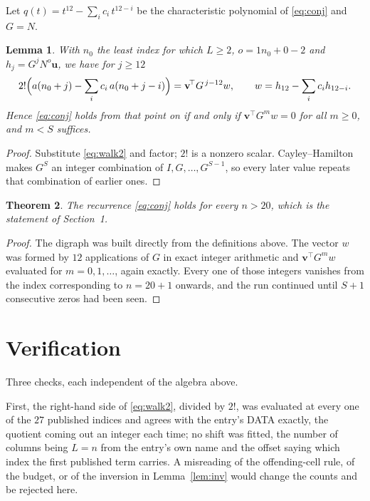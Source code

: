 \documentclass[11pt,a4paper]{article}
\theoremstyle{plain}
\newtheorem{theorem}{Theorem}
\newtheorem{lemma}[theorem]{Lemma}
\theoremstyle{definition}
\begin{document}
Let $q(t)=t^{12}-\sum_i c_i\,t^{12-i}$ be the characteristic polynomial of
\eqref{eq:conj} and $G=N$.

\begin{lemma}\label{lem:crit}
With $n_0$ the least index for which $L\ge2$, $o=1n_0+0-2$ and
$h_j=G^{j}N^{o}\mathbf{u}$, we have for $j\ge12$
\[
2!\Bigl(a(n_0+j)-\sum_i c_i\,a(n_0+j-i)\Bigr)=\mathbf{v}^{\!\top}G^{\,j-12}w,
\qquad w=h_{12}-\sum_i c_i h_{12-i} .
\]
Hence \eqref{eq:conj} holds from that point on if and only if
$\mathbf{v}^{\!\top}G^{m}w=0$ for all $m\ge0$, and $m<S$ suffices.
\end{lemma}

\begin{proof}
Substitute \eqref{eq:walk2} and factor; $2!$ is a nonzero scalar. Cayley--Hamilton
makes $G^{S}$ an integer combination of $I,G,\dots,G^{S-1}$, so every later value repeats
that combination of earlier ones.
\end{proof}

\begin{theorem}
The recurrence \eqref{eq:conj} holds for every $n>20$, which is the statement of
Section~1.
\end{theorem}

\begin{proof}
The digraph was built directly from the definitions above. The vector $w$ was formed by
$12$ applications of $G$ in exact integer arithmetic and $\mathbf{v}^{\!\top}G^{m}w$
evaluated for $m=0,1,\dots$, again exactly. Every one of those integers vanishes from the
index corresponding to $n=20+1$ onwards, and the run continued until $S+1$ consecutive
zeros had been seen.
\end{proof}

\section{Verification}

Three checks, each independent of the algebra above.

First, the right-hand side of \eqref{eq:walk2}, divided by $2!$, was evaluated at every
one of the $27$ published indices and agrees with the entry's DATA exactly, the quotient
coming out an integer each time; no shift was fitted, the number of columns being
$L=n$ from the entry's own name and the offset saying which index the first published
term carries. A misreading of the offending-cell rule, of the budget, or of the inversion in
Lemma~\ref{lem:inv} would change the counts and be rejected here.
\end{document}
